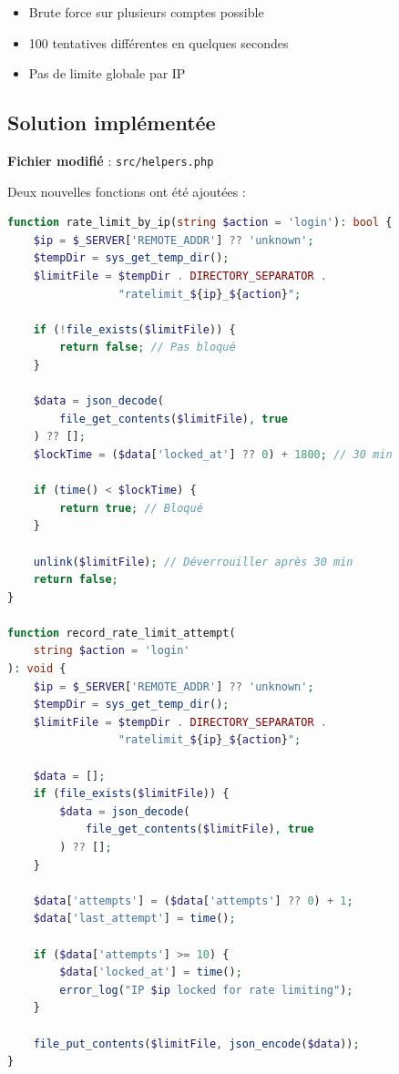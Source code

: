 \documentclass[11pt,a4paper,french]{report}
\begin{document}
\begin{itemize}
    \item Brute force sur plusieurs comptes possible
    \item 100 tentatives différentes en quelques secondes
    \item Pas de limite globale par IP
\end{itemize}

\subsection{Solution implémentée}

\textbf{Fichier modifié} : \texttt{src/helpers.php}

Deux nouvelles fonctions ont été ajoutées :

\begin{lstlisting}[language=PHP]
function rate_limit_by_ip(string $action = 'login'): bool {
    $ip = $_SERVER['REMOTE_ADDR'] ?? 'unknown';
    $tempDir = sys_get_temp_dir();
    $limitFile = $tempDir . DIRECTORY_SEPARATOR . 
                 "ratelimit_${ip}_${action}";
    
    if (!file_exists($limitFile)) {
        return false; // Pas bloqué
    }
    
    $data = json_decode(
        file_get_contents($limitFile), true
    ) ?? [];
    $lockTime = ($data['locked_at'] ?? 0) + 1800; // 30 min
    
    if (time() < $lockTime) {
        return true; // Bloqué
    }
    
    unlink($limitFile); // Déverrouiller après 30 min
    return false;
}

function record_rate_limit_attempt(
    string $action = 'login'
): void {
    $ip = $_SERVER['REMOTE_ADDR'] ?? 'unknown';
    $tempDir = sys_get_temp_dir();
    $limitFile = $tempDir . DIRECTORY_SEPARATOR . 
                 "ratelimit_${ip}_${action}";
    
    $data = [];
    if (file_exists($limitFile)) {
        $data = json_decode(
            file_get_contents($limitFile), true
        ) ?? [];
    }
    
    $data['attempts'] = ($data['attempts'] ?? 0) + 1;
    $data['last_attempt'] = time();
    
    if ($data['attempts'] >= 10) {
        $data['locked_at'] = time();
        error_log("IP $ip locked for rate limiting");
    }
    
    file_put_contents($limitFile, json_encode($data));
}
\end{lstlisting}
\end{document}
